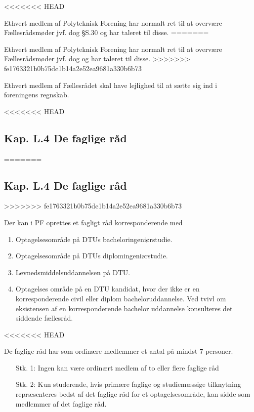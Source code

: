 \begin{list}
<<<<<<< HEAD
\item Ethvert medlem af Polyteknisk Forening har normalt ret til at overvære Fællesrådsmøder jvf. dog §S.30 og har taleret til disse.
=======
\item Ethvert medlem af Polyteknisk Forening har normalt ret til at overvære Fællesrådsmøder jvf. dog  og har taleret til disse.
>>>>>>> fe1763321b0b75dc1b14a2e52ea9681a330b6b73

\item Ethvert medlem af Fællesrådet skal have lejlighed til at sætte sig ind i foreningens regnskab.


<<<<<<< HEAD
\subsection{Kap. L.4 De faglige råd}
\label{kapL:DeFagligeRaad}
=======
\subsection*{Kap. L.4 De faglige råd}
\label{L:kap:Faglige}
>>>>>>> fe1763321b0b75dc1b14a2e52ea9681a330b6b73

\item \label{L4:hvem} Der kan i PF oprettes et fagligt råd korresponderende med
	\begin{enumerate}
	\item Optagelsesområde på DTUs bacheloringeniørstudie.
	\item Optagelsesområde på DTUs diplomingeniørstudie.
	\item Levnedsmiddelsuddannelsen på DTU.
	\item Optagelses område på en DTU kandidat, hvor der ikke er en korresponderende civil eller diplom bacheloruddannelse. Ved tvivl om eksistensen af en korresponderende bachelor uddannelse konsulteres det siddende fællesråd.
	\end{enumerate}     
    
<<<<<<< HEAD
\item \label{L4:ordinaere} De faglige råd har som ordinære medlemmer et antal på mindst 7 personer.
\begin{itemize}%
	\item[Stk. 1:] \label{L4:ordinaere1} Ingen kan være ordinært medlem af to eller flere faglige råd
	
	\item[Stk. 2:] Kun studerende, hvis primære faglige og studiemæssige tilknytning repræsenteres bedst af det faglige råd for et optagelsesområde, kan sidde som medlemmer af det faglige råd.
	

\end{itemize}
\end{list}
